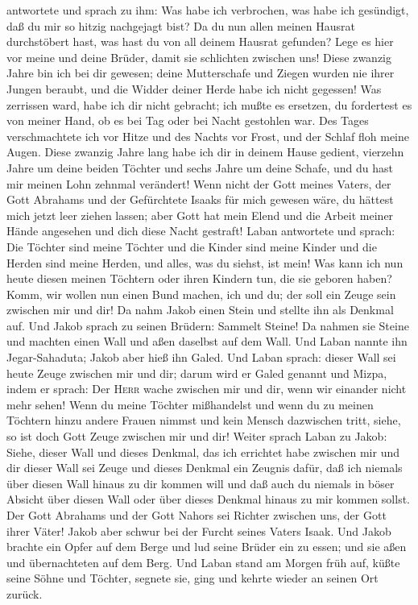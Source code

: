 antwortete und sprach zu ihm: Was habe ich verbrochen, was habe ich
gesündigt, daß du mir so hitzig nachgejagt bist?  Da du
nun allen meinen Hausrat durchstöbert hast, was hast du von all deinem
Hausrat gefunden? Lege es hier vor meine und deine Brüder, damit sie
schlichten zwischen uns!  Diese zwanzig Jahre bin ich bei
dir gewesen; deine Mutterschafe und Ziegen wurden nie ihrer Jungen
beraubt, und die Widder deiner Herde habe ich nicht gegessen!
 Was zerrissen ward, habe ich dir nicht gebracht; ich
mußte es ersetzen, du fordertest es von meiner Hand, ob es bei Tag oder
bei Nacht gestohlen war.  Des Tages verschmachtete ich
vor Hitze und des Nachts vor Frost, und der Schlaf floh meine Augen.
 Diese zwanzig Jahre lang habe ich dir in deinem Hause
gedient, vierzehn Jahre um deine beiden Töchter und sechs Jahre um deine
Schafe, und du hast mir meinen Lohn zehnmal verändert! 
Wenn nicht der Gott meines Vaters, der Gott Abrahams und der Gefürchtete
Isaaks für mich gewesen wäre, du hättest mich jetzt leer ziehen lassen;
aber Gott hat mein Elend und die Arbeit meiner Hände angesehen und dich
diese Nacht gestraft!  Laban antwortete und sprach: Die
Töchter sind meine Töchter und die Kinder sind meine Kinder und die
Herden sind meine Herden, und alles, was du siehst, ist mein! Was kann
ich nun heute diesen meinen Töchtern oder ihren Kindern tun, die sie
geboren haben?  Komm, wir wollen nun einen Bund machen,
ich und du; der soll ein Zeuge sein zwischen mir und dir!
 Da nahm Jakob einen Stein und stellte ihn als Denkmal
auf.  Und Jakob sprach zu seinen Brüdern: Sammelt Steine!
Da nahmen sie Steine und machten einen Wall und aßen daselbst auf dem
Wall.  Und Laban nannte ihn Jegar-Sahaduta; Jakob aber
hieß ihn Galed.  Und Laban sprach: dieser Wall sei heute
Zeuge zwischen mir und dir; darum wird er Galed genannt 
und Mizpa, indem er sprach: Der \textsc{Herr} wache zwischen mir und
dir, wenn wir einander nicht mehr sehen!  Wenn du meine
Töchter mißhandelst und wenn du zu meinen Töchtern hinzu andere Frauen
nimmst und kein Mensch dazwischen tritt, siehe, so ist doch Gott Zeuge
zwischen mir und dir!  Weiter sprach Laban zu Jakob:
Siehe, dieser Wall und dieses Denkmal, das ich errichtet habe zwischen
mir und dir  dieser Wall sei Zeuge und dieses Denkmal ein
Zeugnis dafür, daß ich niemals über diesen Wall hinaus zu dir kommen
will und daß auch du niemals in böser Absicht über diesen Wall oder über
dieses Denkmal hinaus zu mir kommen sollst.  Der Gott
Abrahams und der Gott Nahors sei Richter zwischen uns, der Gott ihrer
Väter! Jakob aber schwur bei der Furcht seines Vaters Isaak.
 Und Jakob brachte ein Opfer auf dem Berge und lud seine
Brüder ein zu essen; und sie aßen und übernachteten auf dem Berg.
 Und Laban stand am Morgen früh auf, küßte seine Söhne
und Töchter, segnete sie, ging und kehrte wieder an seinen Ort zurück.


